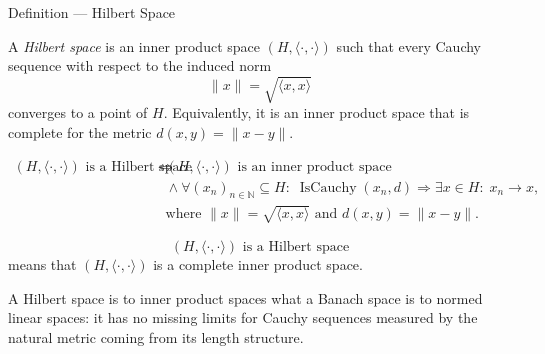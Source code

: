 \begin{definitionbox}{Definition --- Hilbert Space}
\begin{definition}\label{def:hilbert-space}
A \emph{Hilbert space} is an inner product space
\((H,\langle\cdot,\cdot\rangle)\) such that every Cauchy sequence with
respect to the induced norm
\[
  \|x\|=\sqrt{\langle x,x\rangle}
\]
converges to a point of \(H\).  Equivalently, it is an inner product space
that is complete for the metric \(d(x,y)=\|x-y\|\).
\end{definition}
\end{definitionbox}

\begin{remark*}
\[
\begin{aligned}
\text{\((H,\langle\cdot,\cdot\rangle)\) is a Hilbert space}
\Longleftrightarrow\;&
\text{\((H,\langle\cdot,\cdot\rangle)\) is an inner product space}
\\
&{}\land
\forall (x_n)_{n\in\mathbb{N}}\subseteq H{:}\;
\operatorname{IsCauchy}(x_n,d)
\Longrightarrow
\exists x\in H{:}\;x_n\to x,
\\
&\text{where }\|x\|=\sqrt{\langle x,x\rangle}
\text{ and }d(x,y)=\|x-y\|.
\end{aligned}
\]
\end{remark*}

\begin{remark*}
\[
\text{\((H,\langle\cdot,\cdot\rangle)\) is a Hilbert space}
\]
means that \((H,\langle\cdot,\cdot\rangle)\) is a complete inner product
space.
\end{remark*}

\begin{remark*}[Interpretation]
A Hilbert space is to inner product spaces what a Banach space is to normed
linear spaces: it has no missing limits for Cauchy sequences measured by the
natural metric coming from its length structure.
\end{remark*}

\DefinitionalRoot
